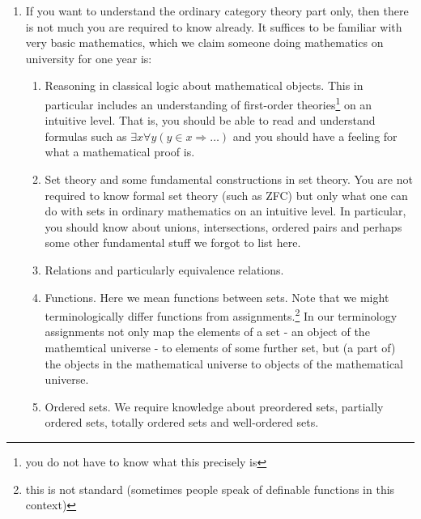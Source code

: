 \begin{enumerate}
\item[(1)]
If you want to understand the ordinary category theory part only, then there is not much you are required to know already. It suffices to be familiar with very basic mathematics, which we claim someone doing mathematics on university for one year is:
\begin{enumerate}
\item[$\bullet$]
Reasoning in classical logic about mathematical objects. This in particular includes an understanding of first-order theories\footnote{you do not have to know what this precisely is} on an intuitive level. That is, you should be able to read and understand formulas such as $\exists x \forall y(y \in x \Rightarrow \ldots)$ and you should have a feeling for what a mathematical proof is.
\item[$\bullet$]
Set theory and some fundamental constructions in set theory. You are not required to know formal set theory (such as ZFC) but only what one can do with sets in ordinary mathematics on an intuitive level. In particular, you should know about unions, intersections, ordered pairs and perhaps some other fundamental stuff we forgot to list here.
\item[$\bullet$]
Relations and particularly equivalence relations.
\item[$\bullet$]
Functions. Here we mean functions between sets. Note that we might terminologically differ functions from {\glqq}assignments{\grqq}.\footnote{this is not standard (sometimes people speak of definable functions in this context)} In our terminology assignments not only map the elements of a set - an object of the mathemtical universe - to elements of some further set, but (a part of) the objects in the mathematical universe to objects of the mathematical universe.
\item[$\bullet$]
Ordered sets. We require knowledge about preordered sets, partially ordered sets, totally ordered sets and well-ordered sets.
\end{enumerate}

\end{enumerate}
